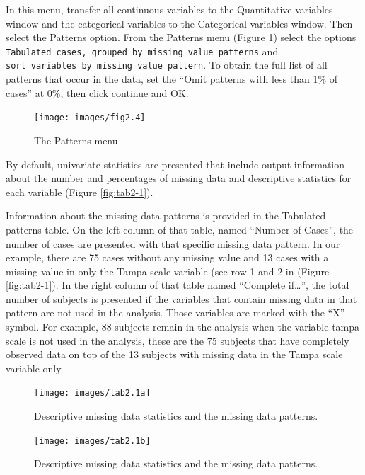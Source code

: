 \documentclass[
]{book}
\begin{document}
In this menu, transfer all continuous variables to the Quantitative variables window and the categorical variables to the Categorical variables window. Then select the Patterns option. From the Patterns menu (Figure \ref{fig:fig2-4}) select the options \texttt{Tabulated\ cases,\ grouped\ by\ missing\ value\ patterns} and \texttt{sort\ variables\ by\ missing\ value\ pattern}. To obtain the full list of all patterns that occur in the data, set the ``Omit patterns with less than 1\% of cases'' at 0\%, then click continue and OK.

\begin{figure}

{\centering \texttt{[image: images/fig2.4]} 

}

\caption{The Patterns menu}\label{fig:fig2-4}
\end{figure}

By default, univariate statistics are presented that include output information about the number and percentages of missing data and descriptive statistics for each variable (Figure \ref{fig:tab2-1}).

Information about the missing data patterns is provided in the Tabulated patterns table. On the left column of that table, named ``Number of Cases'', the number of cases are presented with that specific missing data pattern. In our example, there are 75 cases without any missing value and 13 cases with a missing value in only the Tampa scale variable (see row 1 and 2 in (Figure \ref{fig:tab2-1}). In the right column of that table named ``Complete if\ldots{}'', the total number of subjects is presented if the variables that contain missing data in that pattern are not used in the analysis. Those variables are marked with the ``X'' symbol. For example, 88 subjects remain in the analysis when the variable tampa scale is not used in the analysis, these are the 75 subjects that have completely observed data on top of the 13 subjects with missing data in the Tampa scale variable only.

\begin{figure}

{\centering \texttt{[image: images/tab2.1a]} 

}

\caption{Descriptive missing data statistics and the missing data patterns.}\label{fig:tab2-1-1}
\end{figure}
\begin{figure}

{\centering \texttt{[image: images/tab2.1b]} 

}

\caption{Descriptive missing data statistics and the missing data patterns.}\label{fig:tab2-1-2}
\end{figure}
\end{document}
